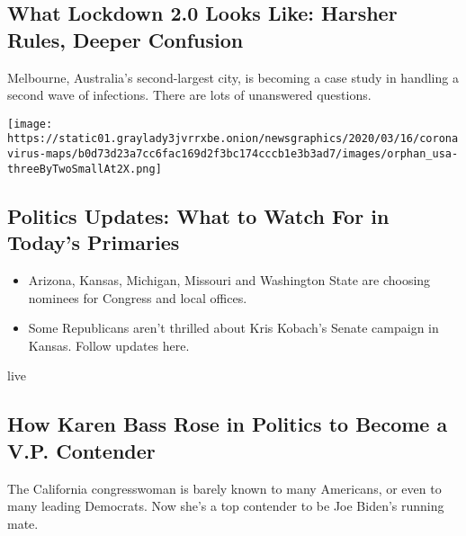\href{/2020/08/04/world/australia/coronavirus-melbourne-lockdown.html}{}

\hypertarget{what-lockdown-20-looks-like-harsher-rules-deeper-confusion}{%
\subsection{What Lockdown 2.0 Looks Like: Harsher Rules, Deeper
Confusion}\label{what-lockdown-20-looks-like-harsher-rules-deeper-confusion}}

Melbourne, Australia's second-largest city, is becoming a case study in
handling a second wave of infections. There are lots of unanswered
questions.

\texttt{[image: https://static01.graylady3jvrrxbe.onion/newsgraphics/2020/03/16/coronavirus-maps/b0d73d23a7cc6fac169d2f3bc174cccb1e3b3ad7/images/orphan\_usa-threeByTwoSmallAt2X.png]}

\href{/2020/08/04/us/elections/primary-election-michigan-arizona-kansas.html}{}

\hypertarget{politics-updates-what-to-watch-for-in-todays-primaries}{%
\subsection{Politics Updates: What to Watch For in Today's
Primaries}\label{politics-updates-what-to-watch-for-in-todays-primaries}}

\begin{itemize}
\tightlist
\item
  Arizona, Kansas, Michigan, Missouri and Washington State are choosing
  nominees for Congress and local offices.
\item
  Some Republicans aren't thrilled about Kris Kobach's Senate campaign
  in Kansas. Follow updates here.
\end{itemize}

live

\href{/2020/08/04/us/politics/karen-bass-vice-president-biden.html}{}

\hypertarget{how-karen-bass-rose-in-politics-to-become-a-vp-contender}{%
\subsection{How Karen Bass Rose in Politics to Become a V.P.
Contender}\label{how-karen-bass-rose-in-politics-to-become-a-vp-contender}}

The California congresswoman is barely known to many Americans, or even
to many leading Democrats. Now she's a top contender to be Joe Biden's
running mate.

